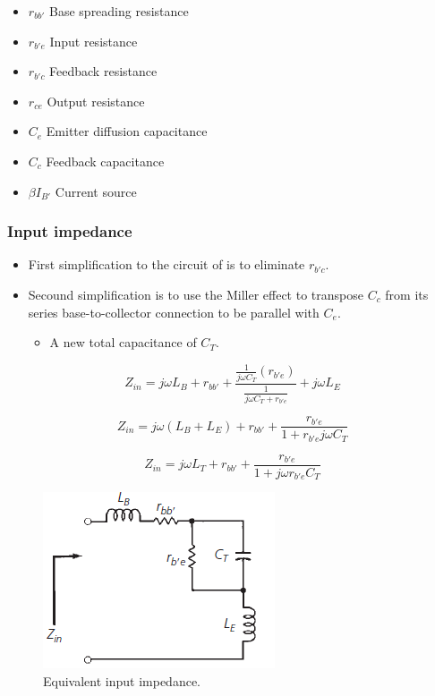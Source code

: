 \begin{itemize}
	\item $r_{bb'}$ Base spreading resistance
	\item $r_{b'e}$ Input resistance
	\item $r_{b'c}$ Feedback resistance
	\item $r_{ce}$ Output resistance
	\item $C_e$ Emitter diffusion capacitance
	\item $C_c$ Feedback capacitance
	\item $\beta I_{B'}$ Current source
\end{itemize}

\subsubsection{Input impedance}
\begin{itemize}
	\item First simplification to the circuit of is to eliminate $r_{b'c}$.
	\item Secound simplification is to use the Miller effect to transpose
	$C_c$ from its series base-to-collector connection to be parallel with $C_e$.
	\begin{itemize}
		\item A new total capacitance of $C_T$.
	\end{itemize}
\end{itemize}

\begin{equation}
Z_{in} = j\omega L_B + r_{bb'}+\dfrac{\frac{1}{j\omega C_T}(r_{b'e})}{\frac{1}{j\omega C_T+r_{b'e}}}+j\omega L_E
\end{equation}

\begin{equation}
Z_{in} = j\omega (L_B+L_E) + r_{bb'}+\dfrac{r_{b'e}}{1+r_{b'e}j\omega C_T}
\end{equation}

\begin{equation}
Z_{in} = j\omega L_T + r_{bb'}+\dfrac{r_{b'e}}{1+j\omega r_{b'e} C_T}
\end{equation}

\begin{figure} [H]
	\centering
	\includegraphics[width=0.4\linewidth]{graphics/34.png}
	\caption{Equivalent input impedance.}
	\label{fig:34}
\end{figure}

